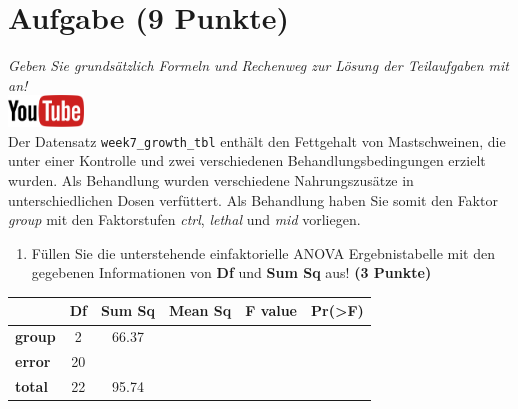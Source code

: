 \documentclass[a4paper, 9pt]{scrartcl}\usepackage[]{graphicx}\usepackage[]{xcolor}
\begin{document}
\clearpage

\section{Aufgabe \hfill (9 Punkte)}

\textit{Geben Sie grunds{\"a}tzlich Formeln und Rechenweg zur L{\"o}sung der
  Teilaufgaben mit an!} \\[1Ex]

\hfill\href{https://youtu.be/IhecxMcCENY}{\includegraphics[width =
  2cm]{img/youtube}}\\[1Ex]




Der Datensatz \texttt{week7\_growth\_tbl} enth{\"a}lt den Fettgehalt von
Mastschweinen, die unter einer Kontrolle und zwei verschiedenen
Behandlungsbedingungen erzielt wurden. Als Behandlung wurden verschiedene
Nahrungszus{\"a}tze in unterschiedlichen Dosen verf{\"u}ttert. Als Behandlung haben
Sie somit den Faktor \textit{group} mit den Faktorstufen
\textit{ctrl}, \textit{lethal} und
\textit{mid} vorliegen.



\begin{enumerate}
\item F{\"u}llen Sie die unterstehende einfaktorielle ANOVA Ergebnistabelle 
  mit den gegebenen Informationen von \textbf{Df} und \textbf{Sum Sq} aus!
  \textbf{(3 Punkte)}
\end{enumerate}

\vspace{1Ex}

\begin{center}
  \Large
  \begin{tabular}{l|c|c|c|c|c}
     & \textbf{Df} & \textbf{Sum Sq} & \textbf{Mean Sq} & \textbf{F value} & \textbf{Pr(>F)} \strut\\
    \hline
   \textbf{group}  & 2 & 66.37 &  &  &  \strut\\
    \hline
   \textbf{error}  & 20 &  &  &  &  \strut\\
        \hline
   \textbf{total}  & 22 & 95.74 &  &  &  \strut\\
  \end{tabular}
\end{center}
\end{document}
